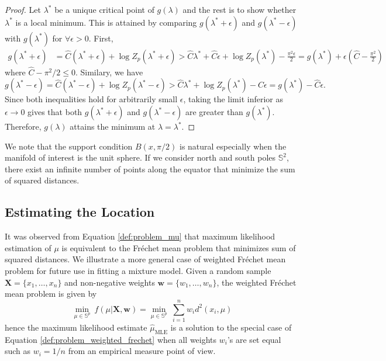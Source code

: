 \documentclass[11pt]{article}
\newcommand{\bbS}{\mathbb{S}}
\newcommand{\bfX}{\mathbf{X}}
\newcommand{\Frechet}{Fr\'{e}chet }
\begin{document}
\begin{proof}
	Let $\lambda^*$ be a unique critical point of $g(\lambda)$ and the rest is to show whether $\lambda^*$ is a local minimum. This is attained by comparing $g(\lambda^*+\epsilon)$ and $g(\lambda^* - \epsilon)$ with $g(\lambda^*)$ for $ \forall \epsilon > 0$. First, 
	\begin{align*}
	g(\lambda^* + \epsilon) &= \hat{C} (\lambda^* + \epsilon) + \log Z_p (\lambda^* + \epsilon) > \hat{C} \lambda^* + \hat{C} \epsilon + \log Z_p(\lambda^*) - \frac{\pi^2 \epsilon}{2} = g(\lambda^*) + \epsilon \left(\hat{C} - \frac{\pi^2}{2}\right)
	\end{align*}
	where $\hat{C} - \pi^2/2 \leq 0$. Similary, we have
	\begin{equation*}
	g(\lambda^*-\epsilon) = \hat{C}(\lambda^*-\epsilon) + \log Z_p (\lambda^* - \epsilon) > \hat{C}\lambda^* + \log Z_p (\lambda^*) - C\epsilon = g(\lambda^*) - \hat{C}\epsilon.
	\end{equation*}
	Since both inequalities hold for arbitrarily small $\epsilon$, taking the limit inferior as $\epsilon \rightarrow 0$ gives that both $g(\lambda^*+\epsilon)$ and $g(\lambda^*-\epsilon)$ are greater than $g(\lambda^*)$. Therefore, $g(\lambda)$ attains the minimum at $\lambda = \lambda^*$. 
\end{proof}


We note that the support condition $B(x,\pi/2)$ is natural especially when the manifold of interest is the unit sphere. If we consider north and south poles $\bbS^2$, there exist an infinite number of points along the equator that minimize the sum of squared distances.




\subsection{Estimating the Location}

It was observed from Equation \eqref{def:problem_mu} that  maximum likelihood estimation of $\mu$ is equivalent to the \Frechet mean problem that minimizes sum of squared distances. We illustrate a more general case of weighted \Frechet mean problem for future use in fitting a mixture model. Given a random sample $ \bfX = \lbrace x_1, \ldots, x_n \rbrace$ and non-negative weights $\mathbf{w} = \lbrace w_1, \ldots, w_n\rbrace$, the weighted \Frechet mean problem is given by
\begin{equation}\label{def:problem_weighted_frechet}
\underset{\mu\in\bbS^p}{\min}~f(\mu| \bfX, \mathbf{w}) = \underset{\mu\in\bbS^p}{\min}~ \sum_{i=1}^n w_i d^2 (x_i, \mu)
\end{equation}
hence the maximum likelihood estimate $\hat{\mu}_{\text{MLE}}$ is a solution to the special case of Equation \eqref{def:problem_weighted_frechet} when all weights $w_i$'s are set equal such as $w_i = 1/n$ from an empirical measure point of view. 
\end{document}

